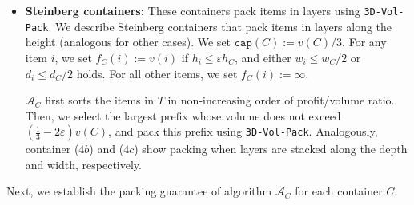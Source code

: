 \documentclass[10pt,a4paper]{amsart}
\newcommand{\kvn}[1]{#1}
\newcommand{\eps}{\varepsilon}
\renewcommand{\epsilon}{\varepsilon} %
\newcommand{\AM}{\mathcal{A}}
\newcommand{\boxes}{containers\xspace}
\newcommand{\tNFDH}{\texttt{3D-NFDH}\xspace}
\theoremstyle{definition}
\newcommand{\lca}{LC\textsuperscript{a}}
\newcommand{\lcb}{LC\textsuperscript{b}}
\newcommand{\LContainers}{$\mathsf{L}$-Containers}
\begin{document}
\begin{itemize}
    $\AM_C$ sorts the items of $T$ in non-decreasing order of profit/volume and selects the largest prefix with volume not exceeding $(1-3\eps)w_Ch_Cd_C$. We pack this prefix using \tNFDH.
    
    \item \textbf{Steinberg \boxes:} These \boxes pack items in layers using \texttt{3D-Vol-Pack}. We describe Steinberg \boxes that pack items in layers along the height  (analogous for other cases). We set $\mathtt{cap}(C) := v(C)/3$. For any item $i$, we set $f_C(i):= v(i)$ if $h_i \le \epsilon h_C$, and either $w_i \le w_C/2$ or $d_i \le d_C/2$ holds. For all other items, we set $f_C(i) := \infty$.

    \kvn{$\AM_C$ first sorts} the items in $T$ in non-increasing order of profit/volume ratio.
    Then, we select the largest prefix whose volume does not exceed $\left(\frac13-2\eps\right)v(C)$, and pack this prefix using \texttt{3D-Vol-Pack}.
    Analogously, container ($4b$) and ($4c$) show packing when layers are stacked along the depth and width, respectively.
\end{itemize}

Next, we establish the packing guarantee of algorithm $\AM_C$ for each container $C$.
\end{document}
